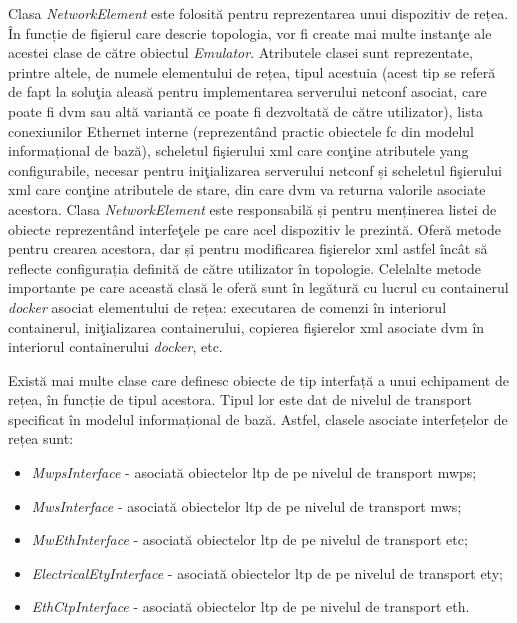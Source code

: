 Clasa \textit{NetworkElement} este folosită pentru reprezentarea unui dispozitiv de rețea. În funcție de fişierul care descrie topologia, vor fi create mai multe instanţe ale acestei clase de către obiectul \textit{Emulator}. Atributele clasei sunt reprezentate, printre altele, de numele elementului de rețea, tipul acestuia (acest tip se referă de fapt la soluţia aleasă pentru implementarea serverului \gls{netconf} asociat, care poate fi \gls{dvm} sau altă variantă ce poate fi dezvoltată de către utilizator), lista conexiunilor Ethernet interne (reprezentând practic obiectele \gls{fc} din modelul informațional de bază), scheletul fişierului \gls{xml} care conţine atributele \gls{yang} configurabile, necesar pentru iniţializarea serverului \gls{netconf} și scheletul fişierului \gls{xml} care conţine atributele de stare, din care \gls{dvm} va returna valorile asociate acestora. Clasa \textit{NetworkElement} este responsabilă și pentru menținerea listei de obiecte reprezentând interfeţele pe care acel dispozitiv le prezintă. Oferă metode pentru crearea acestora, dar și pentru modificarea fişierelor \gls{xml} astfel încât să reflecte configurația definită de către utilizator în topologie. Celelalte metode importante pe care această clasă le oferă sunt în legătură cu lucrul cu containerul \textit{docker} asociat elementului de rețea: executarea de comenzi în interiorul containerul, iniţializarea containerului, copierea fişierelor \gls{xml} asociate \gls{dvm} în interiorul containerului \textit{docker}, etc.

Există mai multe clase care definesc obiecte de tip interfață a unui echipament de rețea, în funcție de tipul acestora. Tipul lor este dat de nivelul de transport specificat în modelul informațional de bază. Astfel, clasele asociate interfețelor de rețea sunt:
\begin{itemize}
	\item \textit{MwpsInterface} - asociată obiectelor \gls{ltp} de pe nivelul de transport \gls{mwps};
	\item \textit{MwsInterface} - asociată obiectelor \gls{ltp} de pe nivelul de transport \gls{mws};
	\item \textit{MwEthInterface} - asociată obiectelor \gls{ltp} de pe nivelul de transport \gls{etc};
	\item \textit{ElectricalEtyInterface} - asociată obiectelor \gls{ltp} de pe nivelul de transport \gls{ety};
	\item \textit{EthCtpInterface} - asociată obiectelor \gls{ltp} de pe nivelul de transport \gls{eth}.
\end{itemize}

